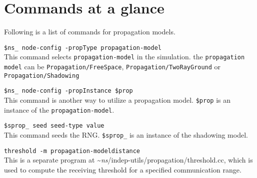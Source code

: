 \section{Commands at a glance}
\label{sec:propcommand}

Following is a list of commands for propagation models.

\begin{flushleft}
{\tt \$ns\_ node-config -propType \<propagation-model\>}\\
This command selects {\tt \<propagation-model\>} in the simulation. the
{\tt \<propagation model\>} can be {\tt Propagation/FreeSpace},
{\tt Propagation/TwoRayGround} or {\tt Propagation/Shadowing}

{\tt \$ns\_ node-config -propInstance \$prop}\\
This command is another way to utilize a propagation model. {\tt \$prop} is
an instance of the {\tt \<propagation-model\>}.

{\tt \$sprop\_ seed \<seed-type\> \<value\>}\\
This command seeds the RNG. {\tt \$sprop\_} is an instance of the shadowing model.

{\tt threshold -m \<propagation-model distance}\\
This is a separate program at \textasciitilde\emph{ns}/{indep-utils/propagation/threshold.cc}, which
is used to compute the receiving threshold for a specified communication range.

\end{flushleft}

\endinput

















